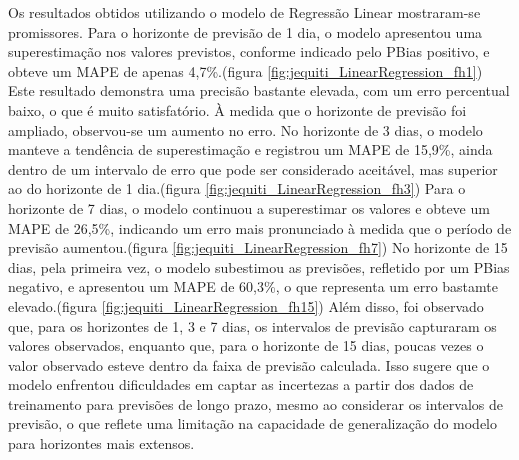 
Os resultados obtidos utilizando o modelo de Regressão Linear mostraram-se promissores. Para o horizonte de previsão de 1 dia, o modelo apresentou uma superestimação nos valores previstos, conforme indicado pelo PBias positivo, e obteve um MAPE de apenas 4,7\%.(figura \ref{fig:jequiti_LinearRegression_fh1}) Este resultado demonstra uma precisão bastante elevada, com um erro percentual baixo, o que é muito satisfatório. À medida que o horizonte de previsão foi ampliado, observou-se um aumento no erro. No horizonte de 3 dias, o modelo manteve a tendência de superestimação e registrou um MAPE de 15,9\%, ainda dentro de um intervalo de erro que pode ser considerado aceitável, mas superior ao do horizonte de 1 dia.(figura \ref{fig:jequiti_LinearRegression_fh3}) Para o horizonte de 7 dias, o modelo continuou a superestimar os valores e obteve um MAPE de 26,5\%, indicando um erro mais pronunciado à medida que o período de previsão aumentou.(figura \ref{fig:jequiti_LinearRegression_fh7}) No horizonte de 15 dias, pela primeira vez, o modelo subestimou as previsões, refletido por um PBias negativo, e apresentou um MAPE de 60,3\%, o que representa um erro bastamte elevado.(figura \ref{fig:jequiti_LinearRegression_fh15}) Além disso, foi observado que, para os horizontes de 1, 3 e 7 dias, os intervalos de previsão capturaram os valores observados, enquanto que, para o horizonte de 15 dias, poucas vezes o valor observado esteve dentro da faixa de previsão calculada. Isso sugere que o modelo enfrentou dificuldades em captar as incertezas a partir dos dados de treinamento para previsões de longo prazo, mesmo ao considerar os intervalos de previsão, o que reflete uma limitação na capacidade de generalização do modelo para horizontes mais extensos.

